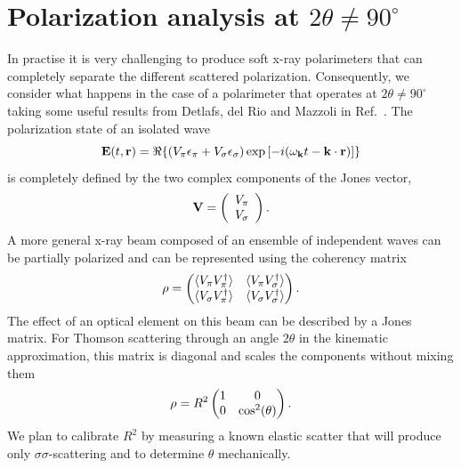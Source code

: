 \documentclass[aps,onecolumn, notitlepage, longbibliography]{revtex4-1}
\begin{document}
\section{Polarization analysis at $2\theta \neq 90^\circ$ }
In practise it is very challenging to produce soft x-ray polarimeters that can completely separate  the different scattered polarization. Consequently, we consider what happens in the case of a polarimeter that operates at $2\theta \neq 90^\circ$ taking some useful results from Detlafs, del Rio and Mazzoli in Ref.~\cite{Detlefs2012}. The polarization state of an isolated wave
\begin{equation}
        {\bf E}(t, {\bf r})
        = \Re \{
                \left(V_{\pi} \epsilon_{\pi} 
                + V_{\sigma} \epsilon_{\sigma}\right)
        \exp \left[ -i(\omega_{\bf k} t - {\bf k}\cdot{\bf r}) \right]
        \}
        \label{el_field}
\end{equation}
is completely defined by the two complex components of the Jones vector,
\begin{equation}
{\bf V} = \left(\begin{array}{c}V_\pi\\V_\sigma\end{array}\right). \end{equation}
A more general x-ray beam composed of an ensemble of independent waves can be partially polarized and can be represented using the coherency matrix
\begin{equation}
{\bf \rho} = 
  \begin{pmatrix}
    \langle V_{\pi}V_{\pi}^{\dagger} \rangle  & \langle V_{\pi}V_{\sigma}^{\dagger} \rangle \\
    \langle V_{\sigma}V_{\pi}^{\dagger} \rangle &  \langle V_{\sigma}V_{\sigma}^{\dagger} \rangle
  \end{pmatrix} .
\end{equation}
The effect of an optical element on this beam can be described by a Jones matrix. For Thomson scattering through an angle $2\theta$ in the kinematic approximation, this matrix is diagonal and scales the components without mixing them
\begin{equation}
{\bf \rho} = R^2
  \begin{pmatrix}
    1  & 0  \\
    0 &  \cos^2(\theta)
  \end{pmatrix} .
\end{equation}
We plan to calibrate $R^2$ by measuring a known elastic scatter that will produce only $\sigma \sigma$-scattering and to determine $\theta$ mechanically. 


\end{document}
